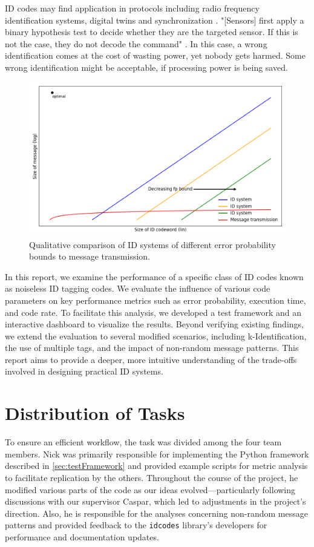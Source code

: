 \documentclass[english,BCOR=4mm,cdfont=false]{tudscrreprt} %
\begin{document}
ID codes may find application in protocols including radio frequency identification systems, digital twins and synchronization \cite{ID_Codes_Topical_Review}.
"[Sensors] first apply a binary hypothesis test to decide whether they are the targeted sensor. If this is not the case, they do not decode the command" \cite{ibrahim2021idcodes}. In this case, a wrong identification comes at the cost of wasting power, yet nobody gets harmed. Some wrong identification might be acceptable, if processing power is being saved.

\begin{figure}[h!]
    \centering
    \includegraphics[width=0.8\linewidth]{images/qualitative_figure.png}
    \caption{Qualitative comparison of ID systems of different error probability bounds to message transmission.}
    \label{fig:qualiPlot}
\end{figure}

In this report, we examine the performance of a specific class of ID codes known as noiseless ID tagging codes. We evaluate the influence of various code parameters on key performance metrics such as error probability, execution time, and code rate. To facilitate this analysis, we developed a test framework and an interactive dashboard to visualize the results. Beyond verifying existing findings, we extend the evaluation to several modified scenarios, including k-Identification, the use of multiple tags, and the impact of non-random message patterns. This report aims to provide a deeper, more intuitive understanding of the trade-offs involved in designing practical ID systems.

\section{Distribution of Tasks}
To ensure an efficient workflow, the task was divided among the four team members. Nick was primarily responsible for implementing the Python framework described in \ref{sec:testFramework} and provided example scripts for metric analysis to facilitate replication by the others. Throughout the course of the project, he modified various parts of the code as our ideas evolved---particularly following discussions with our supervisor Caspar, which led to adjustments in the project's direction. Also, he is responsible for the analyses concerning non-random message patterns and provided feedback to the \texttt{idcodes} library's developers for performance and documentation updates.
\end{document}
